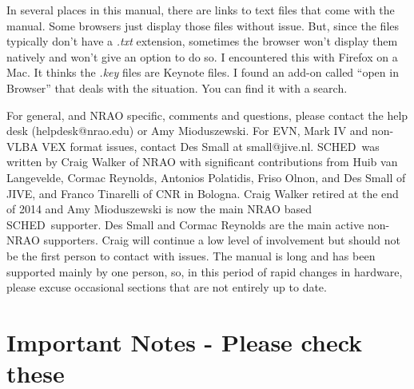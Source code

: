 \documentclass{report}
\newcommand{\schedb}{{\sc SCHED~}}
\begin{document}
In several places in this manual, there are links to text files that
come with the manual.  Some browsers just display those files without 
issue.  But, since the files typically don't have a {\sl .txt} extension, 
sometimes the browser won't display them natively and won't give an
option to do so.  I encountered this with Firefox on a Mac.  It thinks
the {\sl .key} files are Keynote files.  I found an add-on called ``open 
in Browser'' that deals with the situation.  You can find it with a 
search.

For general, and NRAO specific, comments and questions, please contact
the help desk (helpdesk@nrao.edu) or Amy Mioduszewski.  For EVN, Mark
IV and non-VLBA VEX format issues, contact Des Small at small@jive.nl.
\schedb was written by Craig Walker of NRAO with significant
contributions from Huib van Langevelde, Cormac Reynolds, Antonios
Polatidis, Friso Olnon, and Des Small of JIVE, and Franco Tinarelli of
CNR in Bologna.  Craig Walker retired at the end of 2014 and Amy
Mioduszewski is now the main NRAO based \schedb supporter.  Des Small
and Cormac Reynolds are the main active non-NRAO supporters.  Craig
will continue a low level of involvement but should not be the first
person to contact with issues.  The manual is long and has been
supported mainly by one person, so, in this period of rapid changes in
hardware, please excuse occasional sections that are not entirely up
to date.

\tableofcontents

\section{\label{SEC:NOTES} Important Notes - Please check these}
\end{document}
